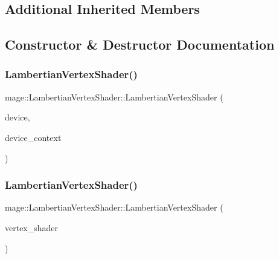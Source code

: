 \subsection*{Additional Inherited Members}


\subsection{Constructor \& Destructor Documentation}
\hypertarget{classmage_1_1_lambertian_vertex_shader_a07be678df09024a53b3f5fc323a7f793}{}\label{classmage_1_1_lambertian_vertex_shader_a07be678df09024a53b3f5fc323a7f793} 
\subsubsection{\texorpdfstring{Lambertian\+Vertex\+Shader()}{LambertianVertexShader()}\hspace{0.1cm}{\footnotesize\ttfamily [1/3]}}
{\footnotesize\ttfamily mage\+::\+Lambertian\+Vertex\+Shader\+::\+Lambertian\+Vertex\+Shader (\begin{DoxyParamCaption}\item[{I\+D3\+D11\+Device2 $\ast$}]{device,  }\item[{I\+D3\+D11\+Device\+Context2 $\ast$}]{device\+\_\+context }\end{DoxyParamCaption})\hspace{0.3cm}{\ttfamily [explicit]}}

\hypertarget{classmage_1_1_lambertian_vertex_shader_add164d66906e307d95232b2c41567a21}{}\label{classmage_1_1_lambertian_vertex_shader_add164d66906e307d95232b2c41567a21} 
\subsubsection{\texorpdfstring{Lambertian\+Vertex\+Shader()}{LambertianVertexShader()}\hspace{0.1cm}{\footnotesize\ttfamily [2/3]}}
{\footnotesize\ttfamily mage\+::\+Lambertian\+Vertex\+Shader\+::\+Lambertian\+Vertex\+Shader (\begin{DoxyParamCaption}\item[{const \hyperlink{classmage_1_1_lambertian_vertex_shader}{Lambertian\+Vertex\+Shader} \&}]{vertex\+\_\+shader }\end{DoxyParamCaption})\hspace{0.3cm}{\ttfamily [delete]}}

